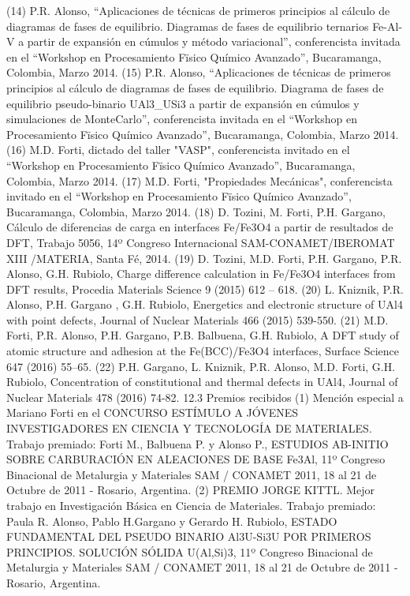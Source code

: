     (14)  P.R. Alonso, “Aplicaciones de técnicas de primeros principios al cálculo de diagramas de fases de equilibrio. Diagramas de fases de equilibrio ternarios Fe-Al-V a partir de expansión en cúmulos y método variacional”, conferencista invitada en el “Workshop en Procesamiento Fïsico Químico Avanzado”, Bucaramanga, Colombia, Marzo 2014.
    (15)  P.R. Alonso, “Aplicaciones de técnicas de primeros principios al cálculo de diagramas de fases de equilibrio. Diagrama de fases de equilibrio pseudo-binario UAl3_USi3 a partir de expansión en cúmulos y simulaciones de MonteCarlo”, conferencista invitada en el “Workshop en Procesamiento Fïsico Químico Avanzado”, Bucaramanga, Colombia, Marzo 2014.
    (16) M.D. Forti, dictado del taller "VASP", conferencista invitado en el “Workshop en Procesamiento Fïsico Químico Avanzado”, Bucaramanga, Colombia, Marzo 2014.
    (17)  M.D. Forti, "Propiedades Mecánicas", conferencista invitado en el “Workshop en Procesamiento Fïsico Químico Avanzado”, Bucaramanga, Colombia, Marzo 2014.
    (18)  D. Tozini, M. Forti, P.H. Gargano, Cálculo de diferencias de carga en interfaces Fe/Fe3O4 a partir de resultados de DFT, Trabajo 5056, 14º Congreso Internacional SAM-CONAMET/IBEROMAT XIII /MATERIA, Santa Fé, 2014.
    (19)  D. Tozini, M.D. Forti, P.H. Gargano, P.R. Alonso, G.H. Rubiolo, Charge difference calculation in Fe/Fe3O4 interfaces from DFT results, Procedia Materials Science 9 (2015) 612 – 618.
    (20) L. Kniznik, P.R. Alonso, P.H. Gargano , G.H. Rubiolo, Energetics and electronic structure of UAl4 with point defects, Journal of Nuclear Materials 466 (2015) 539-550.
    (21) M.D. Forti, P.R. Alonso, P.H. Gargano, P.B. Balbuena, G.H. Rubiolo, A DFT study of atomic structure and adhesion at the Fe(BCC)/Fe3O4 interfaces, Surface Science 647 (2016) 55–65.
    (22)  P.H. Gargano, L. Kniznik, P.R. Alonso, M.D. Forti, G.H. Rubiolo, Concentration of constitutional and thermal defects in UAl4, Journal of Nuclear Materials 478 (2016) 74-82.
12.3  Premios recibidos 
    (1)  Mención especial a Mariano Forti en el CONCURSO ESTÍMULO A JÓVENES INVESTIGADORES EN CIENCIA Y TECNOLOGÍA DE MATERIALES. Trabajo premiado: Forti M., Balbuena P. y Alonso P., ESTUDIOS AB-INITIO SOBRE CARBURACIÓN EN ALEACIONES DE BASE Fe3Al, 11º Congreso Binacional de Metalurgia y Materiales SAM / CONAMET 2011, 18 al 21 de Octubre de 2011 - Rosario, Argentina.
    (2)  PREMIO JORGE KITTL. Mejor trabajo en Investigación Básica en Ciencia de Materiales. Trabajo premiado: Paula R. Alonso, Pablo H.Gargano y Gerardo H. Rubiolo, ESTADO FUNDAMENTAL DEL PSEUDO BINARIO Al3U-Si3U POR PRIMEROS PRINCIPIOS. SOLUCIÓN SÓLIDA U(Al,Si)3, 11º Congreso Binacional de Metalurgia y Materiales SAM / CONAMET 2011, 18 al 21 de Octubre de 2011 - Rosario, Argentina.
